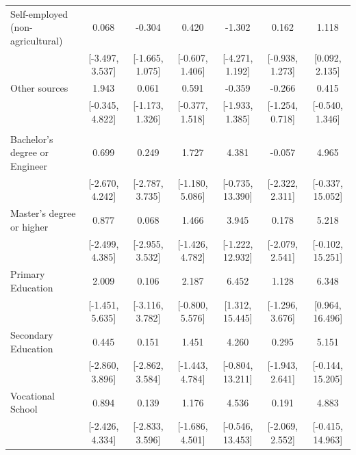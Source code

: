 \documentclass[
  10,
  letterpaper,
  DIV=11,
  numbers=noendperiod]{scrartcl}
\begin{document}
\begin{table}
\begin{tabular}[t]{lcccccc}
\hspace{1em}Self-employed (non-agricultural) & 0.068 & -0.304 & 0.420 & -1.302 & 0.162 & 1.118\\
\hspace{1em} & {}[-3.497, 3.537] & {}[-1.665, 1.075] & {}[-0.607, 1.406] & {}[-4.271, 1.192] & {}[-0.938, 1.273] & {}[0.092, 2.135]\\
\hspace{1em}Other sources & 1.943 & 0.061 & 0.591 & -0.359 & -0.266 & 0.415\\
\hspace{1em} & {}[-0.345, 4.822] & {}[-1.173, 1.326] & {}[-0.377, 1.518] & {}[-1.933, 1.385] & {}[-1.254, 0.718] & {}[-0.540, 1.346]\\
\addlinespace[0.3em]
\multicolumn{7}{l}{\cellcolor[HTML]{3498DB}{\textbf{Education}}}\\
\hspace{1em}Bachelor's degree or Engineer & 0.699 & 0.249 & 1.727 & 4.381 & -0.057 & 4.965\\
\hspace{1em} & {}[-2.670, 4.242] & {}[-2.787, 3.735] & {}[-1.180, 5.086] & {}[-0.735, 13.390] & {}[-2.322, 2.311] & {}[-0.337, 15.052]\\
\hspace{1em}Master's degree or higher & 0.877 & 0.068 & 1.466 & 3.945 & 0.178 & 5.218\\
\hspace{1em} & {}[-2.499, 4.385] & {}[-2.955, 3.532] & {}[-1.426, 4.782] & {}[-1.222, 12.932] & {}[-2.079, 2.541] & {}[-0.102, 15.251]\\
\hspace{1em}Primary Education & 2.009 & 0.106 & 2.187 & 6.452 & 1.128 & 6.348\\
\hspace{1em} & {}[-1.451, 5.635] & {}[-3.116, 3.782] & {}[-0.800, 5.576] & {}[1.312, 15.445] & {}[-1.296, 3.676] & {}[0.964, 16.496]\\
\hspace{1em}Secondary Education & 0.445 & 0.151 & 1.451 & 4.260 & 0.295 & 5.151\\
\hspace{1em} & {}[-2.860, 3.896] & {}[-2.862, 3.584] & {}[-1.443, 4.784] & {}[-0.804, 13.211] & {}[-1.943, 2.641] & {}[-0.144, 15.205]\\
\hspace{1em}Vocational School & 0.894 & 0.139 & 1.176 & 4.536 & 0.191 & 4.883\\
\hspace{1em} & {}[-2.426, 4.334] & {}[-2.833, 3.596] & {}[-1.686, 4.501] & {}[-0.546, 13.453] & {}[-2.069, 2.552] & {}[-0.415, 14.963]\\

\end{tabular}
\end{table}
\end{document}
